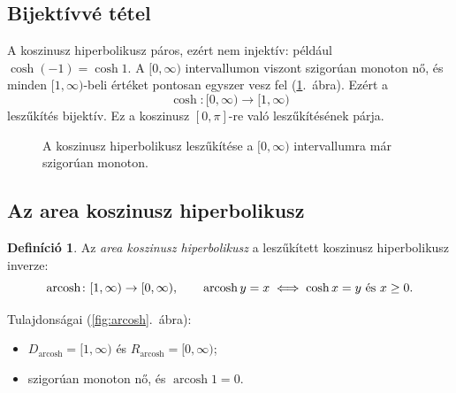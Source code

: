 \documentclass[11pt]{scrartcl}
\DeclareMathOperator{\arcosh}{arcosh}
\theoremstyle{definition}
\newtheorem{definition}{Definíció}
\theoremstyle{remark}
\begin{document}
\subsection{Bijektívvé tétel}

A koszinusz hiperbolikusz páros, ezért nem injektív: például
$\cosh(-1) = \cosh 1$. A $[0, \infty)$ intervallumon viszont szigorúan monoton
nő, és minden $[1, \infty)$-beli értéket pontosan egyszer vesz fel
(\ref{fig:cosh-restriction}.~ábra). Ezért a
\[
	\cosh\colon [0, \infty) \to [1, \infty)
\]
leszűkítés bijektív. Ez a koszinusz $[0, \pi]$-re való leszűkítésének párja.

\begin{figure}[ht]
	\centering
	\caption{A koszinusz hiperbolikusz leszűkítése a $[0, \infty)$
		intervallumra már szigorúan monoton.}
	\label{fig:cosh-restriction}
\end{figure}

\subsection{Az area koszinusz hiperbolikusz}

\begin{definition}
	Az \emph{area koszinusz hiperbolikusz} a leszűkített koszinusz
	hiperbolikusz inverze:
	\[
		\arcosh\colon [1, \infty) \to [0, \infty),
		\qquad
		\arcosh y = x \iff \cosh x = y \text{ és } x \ge 0\text.
	\]
\end{definition}

Tulajdonságai (\ref{fig:arcosh}.~ábra):
\begin{itemize}
	\item $D_{\arcosh} = [1, \infty)$ és $R_{\arcosh} = [0, \infty)$;
	\item szigorúan monoton nő, és $\arcosh 1 = 0$.
\end{itemize}
\end{document}
